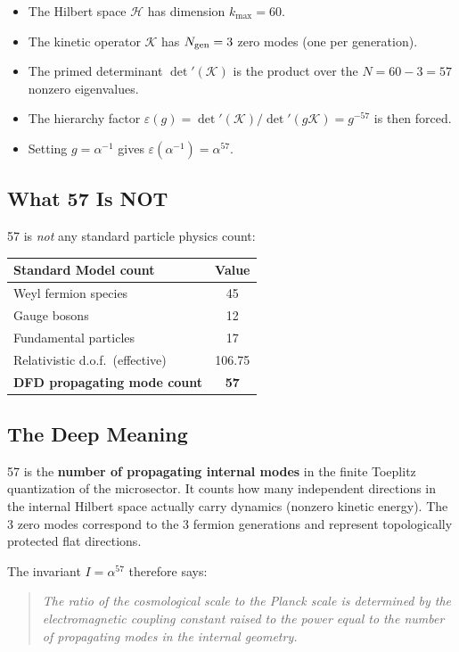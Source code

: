 \documentclass[11pt]{article}
\begin{document}
\begin{itemize}
\item The Hilbert space $\mathcal{H}$ has dimension $k_{\max} = 60$.
\item The kinetic operator $\mathcal{K}$ has $N_{\rm gen} = 3$ zero modes
      (one per generation).
\item The primed determinant $\det'(\mathcal{K})$ is the product over
      the $N = 60 - 3 = 57$ nonzero eigenvalues.
\item The hierarchy factor
      $\varepsilon(g) = \det'(\mathcal{K})/\det'(g\mathcal{K}) = g^{-57}$
      is then forced.
\item Setting $g = \alpha^{-1}$ gives $\varepsilon(\alpha^{-1}) = \alpha^{57}$.
\end{itemize}

\subsection{What 57 Is NOT}

57 is \emph{not} any standard particle physics count:
\begin{center}
\begin{tabular}{lc}
\toprule
Standard Model count & Value \\
\midrule
Weyl fermion species & 45 \\
Gauge bosons & 12 \\
Fundamental particles & 17 \\
Relativistic d.o.f.\ (effective) & 106.75 \\
\textbf{DFD propagating mode count} & \textbf{57} \\
\bottomrule
\end{tabular}
\end{center}

\subsection{The Deep Meaning}

57 is the \textbf{number of propagating internal modes} in the finite
Toeplitz quantization of the microsector. It counts how many independent
directions in the internal Hilbert space actually carry dynamics (nonzero
kinetic energy). The 3 zero modes correspond to the 3 fermion generations
and represent topologically protected flat directions.

The invariant $I = \alpha^{57}$ therefore says:
\begin{quote}
\emph{The ratio of the cosmological scale to the Planck scale is
determined by the electromagnetic coupling constant raised to the power
equal to the number of propagating modes in the internal geometry.}
\end{quote}
\end{document}
